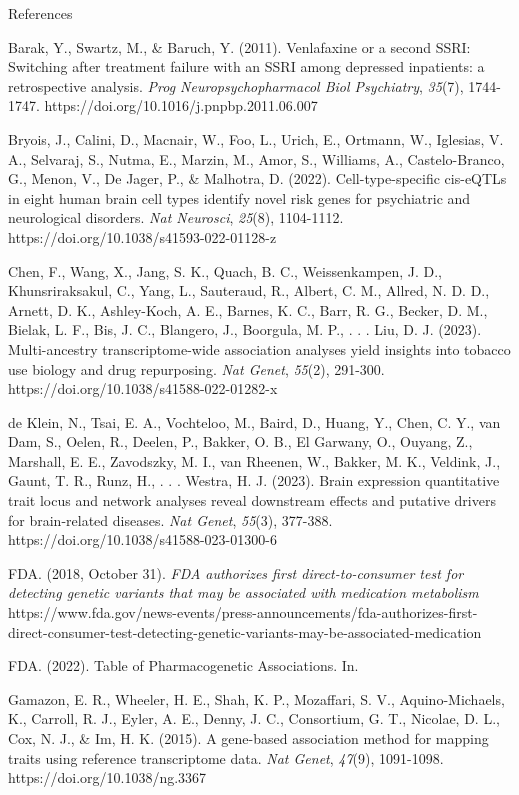 \documentclass[
]{article}
\begin{document}
References

\hfill\break

Barak, Y., Swartz, M., \& Baruch, Y. (2011). Venlafaxine or a second
SSRI: Switching after treatment failure with an SSRI among depressed
inpatients: a retrospective analysis. \emph{Prog Neuropsychopharmacol
Biol Psychiatry}, \emph{35}(7), 1744-1747.
https://doi.org/10.1016/j.pnpbp.2011.06.007{~}

Bryois, J., Calini, D., Macnair, W., Foo, L., Urich, E., Ortmann, W.,
Iglesias, V. A., Selvaraj, S., Nutma, E., Marzin, M., Amor, S.,
Williams, A., Castelo-Branco, G., Menon, V., De Jager, P., \& Malhotra,
D. (2022). Cell-type-specific cis-eQTLs in eight human brain cell types
identify novel risk genes for psychiatric and neurological disorders.
\emph{Nat Neurosci}, \emph{25}(8), 1104-1112.
https://doi.org/10.1038/s41593-022-01128-z{~}

Chen, F., Wang, X., Jang, S. K., Quach, B. C., Weissenkampen, J. D.,
Khunsriraksakul, C., Yang, L., Sauteraud, R., Albert, C. M., Allred, N.
D. D., Arnett, D. K., Ashley-Koch, A. E., Barnes, K. C., Barr, R. G.,
Becker, D. M., Bielak, L. F., Bis, J. C., Blangero, J., Boorgula, M. P.,
. . . Liu, D. J. (2023). Multi-ancestry transcriptome-wide association
analyses yield insights into tobacco use biology and drug repurposing.
\emph{Nat Genet}, \emph{55}(2), 291-300.
https://doi.org/10.1038/s41588-022-01282-x{~}

de Klein, N., Tsai, E. A., Vochteloo, M., Baird, D., Huang, Y., Chen, C.
Y., van Dam, S., Oelen, R., Deelen, P., Bakker, O. B., El Garwany, O.,
Ouyang, Z., Marshall, E. E., Zavodszky, M. I., van Rheenen, W., Bakker,
M. K., Veldink, J., Gaunt, T. R., Runz, H., . . . Westra, H. J. (2023).
Brain expression quantitative trait locus and network analyses reveal
downstream effects and putative drivers for brain-related diseases.
\emph{Nat Genet}, \emph{55}(3), 377-388.
https://doi.org/10.1038/s41588-023-01300-6{~}

FDA. (2018, October 31). \emph{FDA authorizes first direct-to-consumer
test for detecting genetic variants that may be associated with
medication metabolism}
https://www.fda.gov/news-events/press-announcements/fda-authorizes-first-direct-consumer-test-detecting-genetic-variants-may-be-associated-medication

FDA. (2022). Table of Pharmacogenetic Associations. In.

Gamazon, E. R., Wheeler, H. E., Shah, K. P., Mozaffari, S. V.,
Aquino-Michaels, K., Carroll, R. J., Eyler, A. E., Denny, J. C.,
Consortium, G. T., Nicolae, D. L., Cox, N. J., \& Im, H. K. (2015). A
gene-based association method for mapping traits using reference
transcriptome data. \emph{Nat Genet}, \emph{47}(9), 1091-1098.
https://doi.org/10.1038/ng.3367{~}
\end{document}

